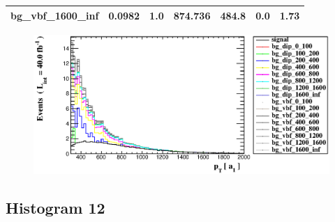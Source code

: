 \documentclass[a4paper, 10pt]{article}
\begin{document}
\begin{table}[H]
\begin{center}
\begin{tabular}{|m{23.0mm}|m{23.0mm}|m{18.0mm}|m{19.0mm}|m{19.0mm}|m{19.0mm}|m{19.0mm}|}
      \hline
      {\cellcolor{white}         bg\_vbf\_1600\_inf}& {\cellcolor{white}         0.0982}& {\cellcolor{white}         1.0}& {\cellcolor{white}         874.736}& {\cellcolor{white}         484.8}& {\cellcolor{green}         0.0}& {\cellcolor{green}         1.73}\\
\hline
    \end{tabular}
  \end{center}
\end{table}

\begin{figure}[H]
  \begin{center}
    \includegraphics[scale=0.45]{selection_10.eps}\\
\caption{   }
  \end{center}
\end{figure}
      \newpage
\subsection{ Histogram 12}
\end{document}
